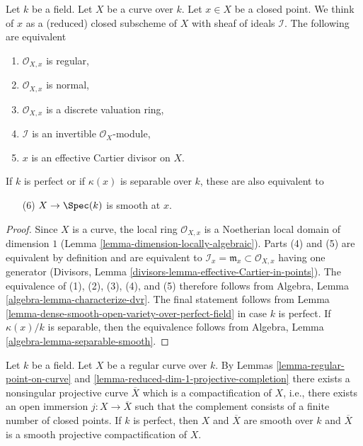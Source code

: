\begin{lemma}
\label{lemma-regular-point-on-curve}
Let $k$ be a field. Let $X$ be a curve over $k$. Let $x \in X$ be a closed
point. We think of $x$ as a (reduced) closed subscheme of $X$ with sheaf
of ideals $\mathcal{I}$. The following are equivalent
\begin{enumerate}
\item $\mathcal{O}_{X, x}$ is regular,
\item $\mathcal{O}_{X, x}$ is normal,
\item $\mathcal{O}_{X, x}$ is a discrete valuation ring,
\item $\mathcal{I}$ is an invertible $\mathcal{O}_X$-module,
\item $x$ is an effective Cartier divisor on $X$.
\end{enumerate}
If $k$ is perfect or if $\kappa(x)$ is separable over $k$,
these are also equivalent to
\begin{enumerate}
\item[(6)] $X \to \Spec(k)$ is smooth at $x$.
\end{enumerate}
\end{lemma}

\begin{proof}
Since $X$ is a curve, the local ring $\mathcal{O}_{X, x}$ is a Noetherian
local domain of dimension $1$ (Lemma \ref{lemma-dimension-locally-algebraic}).
Parts (4) and (5) are equivalent by definition and are equivalent to
$\mathcal{I}_x = \mathfrak m_x \subset \mathcal{O}_{X, x}$ having one generator
(Divisors, Lemma \ref{divisors-lemma-effective-Cartier-in-points}).
The equivalence of (1), (2), (3), (4), and (5) therefore follows from
Algebra, Lemma \ref{algebra-lemma-characterize-dvr}. The final statement
follows from Lemma \ref{lemma-dense-smooth-open-variety-over-perfect-field}
in case $k$ is perfect. If $\kappa(x)/k$ is separable, then the equivalence
follows from Algebra, Lemma \ref{algebra-lemma-separable-smooth}.
\end{proof}

\begin{remark}
\label{remark-smooth-projective-compactification}
Let $k$ be a field. Let $X$ be a regular curve over $k$. By
Lemmas \ref{lemma-regular-point-on-curve} and
\ref{lemma-reduced-dim-1-projective-completion}
there exists a nonsingular projective curve $\overline{X}$
which is a compactification of $X$, i.e., there exists an
open immersion $j : X \to \overline{X}$ such that the complement
consists of a finite number of closed points. If $k$ is perfect,
then $X$ and $\overline{X}$ are smooth over $k$ and
$\overline{X}$ is a smooth projective compactification of $X$.
\end{remark}

